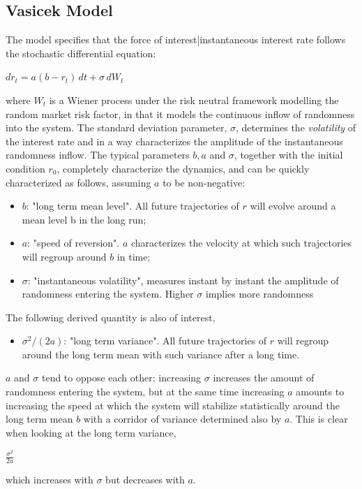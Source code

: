 \documentclass[10pt, oneside, reqno]{amsbook}
\theoremstyle{plain}%
\theoremstyle{definition}
\theoremstyle{rem}
\theoremstyle{definition}
\numberwithin{equation}{chapter}
\begin{document}
\subsection{Vasicek Model}
The model specifies that the force of interest|instantaneous interest rate follows 
the stochastic differential equation:

$dr_t = a(b-r_t)\, dt + \sigma \, dW_t$

where $W_{t}$ is a Wiener process under the risk neutral framework modelling the random market risk factor,
 in that it models the continuous inflow of randomness into the system. The standard deviation parameter, $\sigma$, 
determines the \textit{volatility} of the interest rate and in a way characterizes the amplitude of the 
instantaneous randomness inflow. The typical parameters $b, a$ and  $\sigma$,
 together with the initial condition $r_0$, completely characterize the dynamics,
 and can be quickly characterized as follows, assuming $a$ to be non-negative: 
\begin{itemize}
\item $b$: "long term mean level". All future trajectories of $r$ will evolve around a mean level b in the long run;
\item $a$: "speed of reversion". $a$ characterizes the velocity at which such trajectories will regroup around
 $b$ in time;
\item $\sigma$: "instantaneous volatility", measures instant by instant the 
amplitude of randomness entering the system. Higher $\sigma$ implies more randomness
\end{itemize}

The following derived quantity is also of interest,
\begin{itemize}
\item ${\sigma^2}/(2 a)$: "long term variance". All future trajectories of $r$ will 
regroup around the long term mean with such variance after a long time. 
\end{itemize}
$a$ and $\sigma$ tend to oppose each other: increasing $\sigma$
 increases the amount of randomness entering the system,
 but at the same time increasing $a$ amounts to increasing the speed at which the system will 
stabilize statistically around the long term mean $b$ with a corridor of variance determined also by $a$. 
This is clear when looking at the long term variance,

$\frac{\sigma^2}{2 a}$

which increases with $\sigma$ but decreases with $a$.
\end{document}
